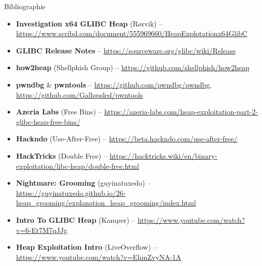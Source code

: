 \documentclass[10pt]{beamer}
\begin{document}
\begin{frame}{Bibliographie}
    \scriptsize
    \begin{itemize}
        \item \textbf{Investigation x64 GLIBC Heap} (Rørvik) -- \url{https://www.scribd.com/document/555969660/HeapExplotationx64GlibC}
        \item \textbf{GLIBC Release Notes} -- \url{https://sourceware.org/glibc/wiki/Release}
        \item \textbf{how2heap} (Shellphish Group) -- \url{https://github.com/shellphish/how2heap}
        \item \textbf{pwndbg} \& \textbf{pwntools} -- \url{https://github.com/pwndbg/pwndbg}, \url{https://github.com/Gallopsled/pwntools}
        \item \textbf{Azeria Labs} (Free Bins) -- \url{https://azeria-labs.com/heap-exploitation-part-2-glibc-heap-free-bins/}
        \item \textbf{Hackndo} (Use-After-Free) -- \url{https://beta.hackndo.com/use-after-free/}
        \item \textbf{HackTricks} (Double Free) -- \url{https://hacktricks.wiki/en/binary-exploitation/libc-heap/double-free.html}
        \item \textbf{Nightmare: Grooming} (guyinatuxedo) -- \url{https://guyinatuxedo.github.io/26-heap_grooming/explanation_heap_grooming/index.html}
        \item \textbf{Intro To GLIBC Heap} (Kamper) -- \url{https://www.youtube.com/watch?v=6-Et7M7qJJg}
        \item \textbf{Heap Exploitation Intro} (LiveOverflow) -- \url{https://www.youtube.com/watch?v=EhmZvyNA-1A}
    \end{itemize}
\end{frame}
\end{document}
